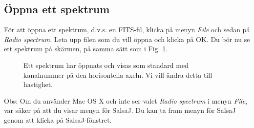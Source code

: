 \documentclass[11pt,swedish,a4paper]{article}
\begin{document}
\subsection{Öppna ett spektrum}
För att öppna ett spektrum, d.v.s. en FITS-fil, klicka på menyn \emph{File} 
och sedan på \emph{Radio spectrum}. Leta upp filen som du vill öppna
och klicka på OK. 
Du bör nu se ett spektrum på skärmen, på samma sätt som i Fig. 
\ref{fig:opened}.
\begin{figure}[h!]
  \centering
  \caption{Ett spektrum har öppnats och 
	  visas som standard med kanalnummer på den horisontella axeln. Vi vill
	  ändra detta till hastighet. 
  }
  \label{fig:opened}
\end{figure}
Obs: Om du använder Mac OS X och inte ser valet \emph{Radio spectrum} 
i menyn \emph{File}, var säker på att du visar menyn för SalsaJ. Du kan 
ta fram menyn för SalsaJ genom att klicka på SalsaJ-fönstret.
\end{document}
